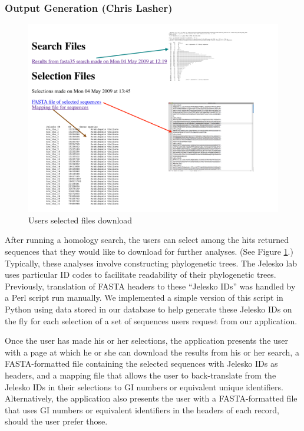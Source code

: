 \documentclass[11pt,letterpaper,twoside,english]{article}
\begin{document}
\subsubsection{\label{sub:Output-Generation}Output Generation (Chris Lasher)}

\begin{figure}[tbp]
    \begin{center}
        \includegraphics[width=1\linewidth]{figures/User_selection}
    \end{center}
    \caption{\label{fig:Users-selected-files}Users selected files download}
\end{figure}


After running a homology search, the users can select among the hits returned
sequences that they would like to download for further analyses. (See Figure
\ref{fig:Users-selected-files}.) Typically,
these analyses involve constructing phylogenetic trees. The Jelesko lab uses
particular ID codes to facilitate readability of their phylogenetic trees.
Previously, translation of FASTA headers to these ``Jelesko IDs'' was handled
by a Perl script run manually. We implemented a simple version of this script
in Python using data stored in our database to help generate these Jelesko IDs
on the fly for each selection of a set of sequences users request from our
application.

Once the user has made his or her selections, the application presents the
user with a page at which he or she can download the results from his or her
search, a FASTA-formatted file containing the selected sequences with Jelesko
IDs as headers, and a mapping file that allows the user to back-translate from
the Jelesko IDs in their selections to GI numbers or equivalent unique
identifiers.  Alternatively, the application also presents the user with a
FASTA-formatted file that uses GI numbers or equivalent identifiers in the
headers of each record, should the user prefer those.
\end{document}
